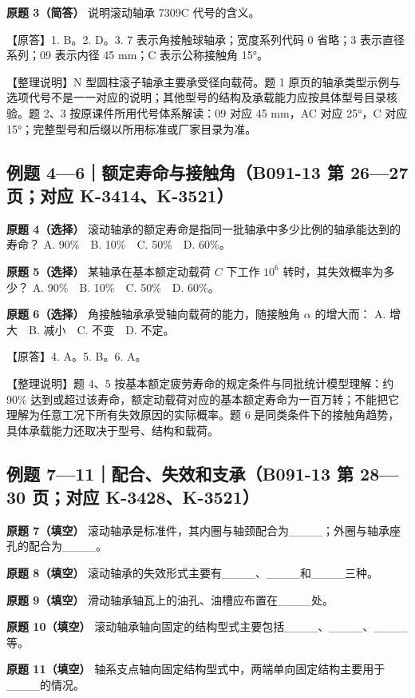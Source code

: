 \documentclass[zihao=5,a4paper,UTF8,fontset=fandol]{ctexart}
\begin{document}
\textbf{原题 3（简答）} 说明滚动轴承 7309C 代号的含义。


【原答】1. B。2. D。3. 7 表示角接触球轴承；宽度系列代码 0 省略；3 表示直径系列；09 表示内径 45 mm；C 表示公称接触角 15°。


【整理说明】N 型圆柱滚子轴承主要承受径向载荷。题 1 原页的轴承类型示例与选项代号不是一一对应的说明；其他型号的结构及承载能力应按具体型号目录核验。题 2、3 按原课件所用代号体系解读：09 对应 45 mm，AC 对应 25°，C 对应 15°；完整型号和后缀以所用标准或厂家目录为准。


\subsection{例题 4—6｜额定寿命与接触角（B091-13 第 26—27 页；对应 K-3414、K-3521）}

\textbf{原题 4（选择）} 滚动轴承的额定寿命是指同一批轴承中多少比例的轴承能达到的寿命？
A. 90\%　B. 10\%　C. 50\%　D. 60\%。


\textbf{原题 5（选择）} 某轴承在基本额定动载荷 $C$ 下工作 $10^6$ 转时，其失效概率为多少？
A. 90\%　B. 10\%　C. 50\%　D. 60\%。


\textbf{原题 6（选择）} 角接触轴承承受轴向载荷的能力，随接触角 $\alpha$ 的增大而：
A. 增大　B. 减小　C. 不变　D. 不定。


【原答】4. A。5. B。6. A。


【整理说明】题 4、5 按基本额定疲劳寿命的规定条件与同批统计模型理解：约 90\% 达到或超过该寿命，额定动载荷对应的基本额定寿命为一百万转；不能把它理解为任意工况下所有失效原因的实际概率。题 6 是同类条件下的接触角趋势，具体承载能力还取决于型号、结构和载荷。


\subsection{例题 7—11｜配合、失效和支承（B091-13 第 28—30 页；对应 K-3428、K-3521）}

\textbf{原题 7（填空）} 滚动轴承是标准件，其内圈与轴颈配合为\_\_\_\_；外圈与轴承座孔的配合为\_\_\_\_。


\textbf{原题 8（填空）} 滚动轴承的失效形式主要有\_\_\_\_、\_\_\_\_和\_\_\_\_三种。


\textbf{原题 9（填空）} 滑动轴承轴瓦上的油孔、油槽应布置在\_\_\_\_处。


\textbf{原题 10（填空）} 滚动轴承轴向固定的结构型式主要包括\_\_\_\_、\_\_\_\_、\_\_\_\_等。


\textbf{原题 11（填空）} 轴系支点轴向固定结构型式中，两端单向固定结构主要用于\_\_\_\_的情况。
\end{document}
